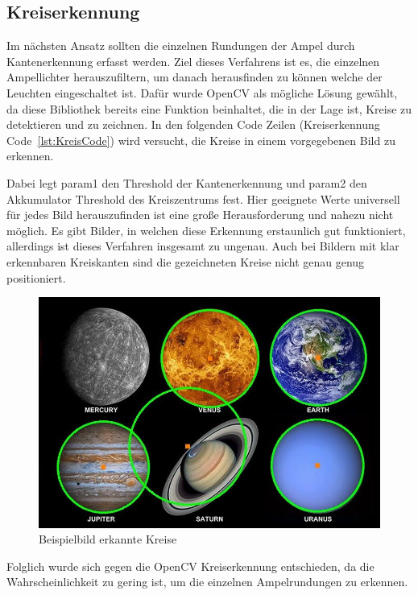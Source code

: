 \documentclass[a4paper,oneside,12pt]{report}
\begin{document}
\begin{onehalfspace}
		\section{Kreiserkennung}
		Im nächsten Ansatz sollten die einzelnen Rundungen der Ampel durch Kantenerkennung erfasst werden. Ziel dieses Verfahrens ist es, die einzelnen Ampellichter herauszufiltern, um danach herausfinden zu können welche der Leuchten eingeschaltet ist. Dafür wurde OpenCV als mögliche Lösung gewählt, da diese Bibliothek bereits eine Funktion beinhaltet, die in der Lage ist, Kreise zu detektieren und zu zeichnen. In den folgenden Code Zeilen (Kreiserkennung Code~\ref{lst:KreisCode}) wird versucht, die Kreise in einem vorgegebenen Bild zu erkennen.
		
		Dabei legt param1 den Threshold der Kantenerkennung und param2 den Akkumulator Threshold des Kreiszentrums fest. Hier geeignete Werte universell für jedes Bild herauszufinden ist eine große Herausforderung und nahezu nicht möglich. Es gibt Bilder, in welchen diese Erkennung erstaunlich gut funktioniert, allerdings ist dieses Verfahren insgesamt zu ungenau. Auch bei Bildern mit klar erkennbaren Kreiskanten sind die gezeichneten Kreise nicht genau genug positioniert.
		\begin{figure}[h!]
			\includegraphics[width=\linewidth]{circles_detected.jpg}
			\caption{Beispielbild erkannte Kreise}
			\label{fig:CirclesDetected}
		\end{figure}
		\newline
		Folglich wurde sich gegen die OpenCV Kreiserkennung entschieden, da die Wahrscheinlichkeit zu gering ist, um die einzelnen Ampelrundungen zu erkennen.

\end{onehalfspace}
\end{document}
